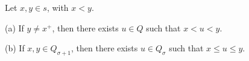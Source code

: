 Let $x, y \in s$, with $x < y$.

(a) If $y \neq x^{+}$, then there exists $u \in Q$ such that $x < u < y$.

(b) If $x, y \in Q_{\sigma+1}$, then there exists $u \in Q_{\sigma}$ such that $x \leq u \leq y$.
